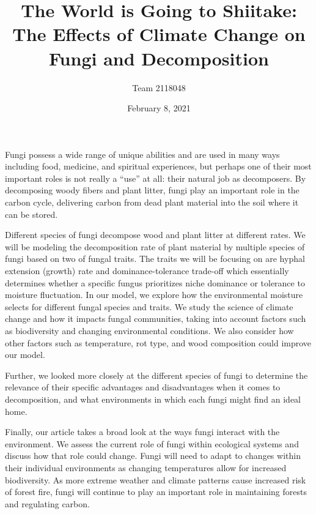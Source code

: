\documentclass[12pt]{article}
\title{The World is Going to Shiitake: The Effects of Climate Change on Fungi and Decomposition}
\author{Team 2118048}
\date{February 8, 2021}
\begin{document}
\thispagestyle{firststyle}

Fungi possess a wide range of unique abilities and are used in many ways including food, medicine, and spiritual experiences, but perhaps one of their most important roles is not really a ``use'' at all: their natural job as decomposers. By decomposing woody fibers and plant litter, fungi play an important role in the carbon cycle, delivering carbon from dead plant material into the soil where it can be stored.  

Different species of fungi decompose wood and plant litter at different rates. We will be modeling the decomposition rate of plant material by multiple species of fungi based on two of fungal traits. The traits we will be focusing on are hyphal extension (growth) rate and dominance-tolerance trade-off which essentially determines whether a specific fungus prioritizes niche dominance or tolerance to moisture fluctuation. In our model, we explore how the environmental moisture selects for different fungal species and traits. We study the science of climate change and how it impacts fungal communities, taking into account factors such as biodiversity and changing environmental conditions. We also consider how other factors such as temperature, rot type, and wood composition could improve our model. 

Further, we looked more closely at the different species of fungi to determine the relevance of their specific advantages and disadvantages when it comes to decomposition, and what environments in which each fungi might find an ideal home.  

Finally, our article takes a broad look at the ways fungi interact with the environment. We assess the current role of fungi within ecological systems and discuss how that role could change. Fungi will need to adapt to changes within their individual environments as changing temperatures allow for increased biodiversity. As more extreme weather and climate patterns cause increased risk of forest fire, fungi will continue to play an important role in maintaining forests and regulating carbon. 


\newpage 

\setcounter{page}{2}
\maketitle

\vspace{30mm}
\end{document}
